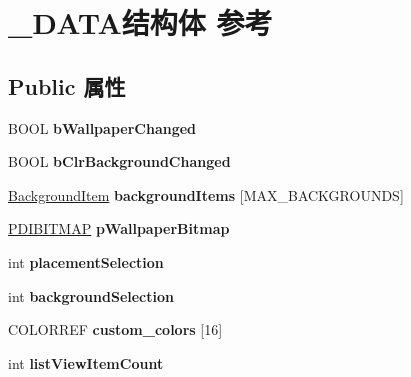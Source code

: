 \hypertarget{struct___d_a_t_a}{}\section{\+\_\+\+D\+A\+T\+A结构体 参考}
\label{struct___d_a_t_a}
\subsection*{Public 属性}
\begin{DoxyCompactItemize}
\item 
\mbox{\label{struct___d_a_t_a_aaaf01cfd95a0a05000056bbcbfaf44ae}} 
B\+O\+OL {\bfseries b\+Wallpaper\+Changed}
\item 
\mbox{\label{struct___d_a_t_a_af74c5d9853331c7ea6f25b0559e00f20}} 
B\+O\+OL {\bfseries b\+Clr\+Background\+Changed}
\item 
\mbox{\label{struct___d_a_t_a_ad41d8e8365f84b3a1974a5e99228a99a}} 
\hyperlink{struct_background_item}{Background\+Item} {\bfseries background\+Items} \mbox{[}M\+A\+X\+\_\+\+B\+A\+C\+K\+G\+R\+O\+U\+N\+DS\mbox{]}
\item 
\mbox{\label{struct___d_a_t_a_a0b13c2b46e400f36fda3f1be3e49a6e5}} 
\hyperlink{struct___d_i_b_i_t_m_a_p}{P\+D\+I\+B\+I\+T\+M\+AP} {\bfseries p\+Wallpaper\+Bitmap}
\item 
\mbox{\label{struct___d_a_t_a_a69cde78f5d52160aadec49f69f01f199}} 
int {\bfseries placement\+Selection}
\item 
\mbox{\label{struct___d_a_t_a_a777fa541a142763ec42533325099cef1}} 
int {\bfseries background\+Selection}
\item 
\mbox{\label{struct___d_a_t_a_a80890f246a78efa98ddf752d25da6405}} 
C\+O\+L\+O\+R\+R\+EF {\bfseries custom\+\_\+colors} \mbox{[}16\mbox{]}
\item 
\mbox{\label{struct___d_a_t_a_aa1d4bdfec4575b247ad3006e8ac90508}} 
int {\bfseries list\+View\+Item\+Count}
\item 
\mbox{\label{struct___d_a_t_a_a23caa63076ae02068c7b73fce9898c7e}} 

\end{DoxyCompactItemize}
